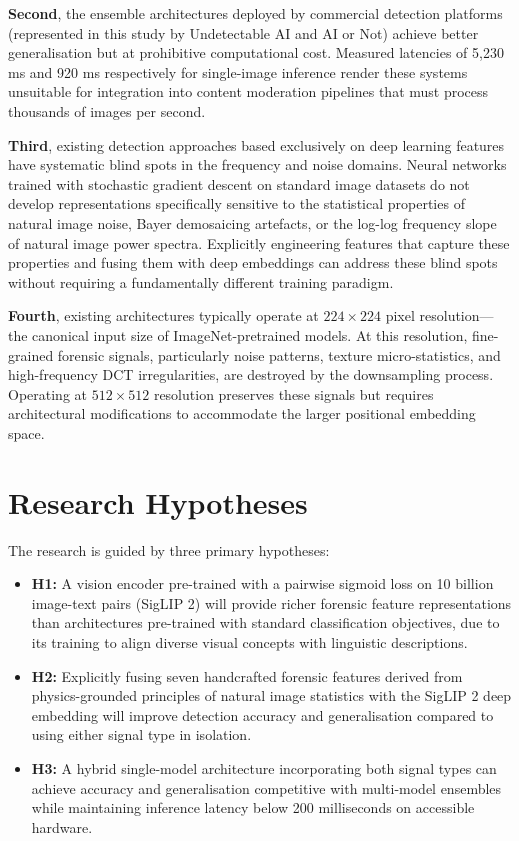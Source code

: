 \textbf{Second}, the ensemble architectures deployed by commercial detection platforms (represented in this study by Undetectable AI and AI or Not) achieve better generalisation but at prohibitive computational cost. Measured latencies of 5,230 ms and 920 ms respectively for single-image inference render these systems unsuitable for integration into content moderation pipelines that must process thousands of images per second.

\textbf{Third}, existing detection approaches based exclusively on deep learning features have systematic blind spots in the frequency and noise domains. Neural networks trained with stochastic gradient descent on standard image datasets do not develop representations specifically sensitive to the statistical properties of natural image noise, Bayer demosaicing artefacts, or the log-log frequency slope of natural image power spectra. Explicitly engineering features that capture these properties and fusing them with deep embeddings can address these blind spots without requiring a fundamentally different training paradigm.

\textbf{Fourth}, existing architectures typically operate at $224 \times 224$ pixel resolution---the canonical input size of ImageNet-pretrained models. At this resolution, fine-grained forensic signals, particularly noise patterns, texture micro-statistics, and high-frequency DCT irregularities, are destroyed by the downsampling process. Operating at $512 \times 512$ resolution preserves these signals but requires architectural modifications to accommodate the larger positional embedding space.

\section{Research Hypotheses}

The research is guided by three primary hypotheses:

\begin{itemize}
    \item \textbf{H1:} A vision encoder pre-trained with a pairwise sigmoid loss on 10 billion image-text pairs (SigLIP 2) will provide richer forensic feature representations than architectures pre-trained with standard classification objectives, due to its training to align diverse visual concepts with linguistic descriptions.

    \item \textbf{H2:} Explicitly fusing seven handcrafted forensic features derived from physics-grounded principles of natural image statistics with the SigLIP 2 deep embedding will improve detection accuracy and generalisation compared to using either signal type in isolation.

    \item \textbf{H3:} A hybrid single-model architecture incorporating both signal types can achieve accuracy and generalisation competitive with multi-model ensembles while maintaining inference latency below 200 milliseconds on accessible hardware.
\end{itemize}


